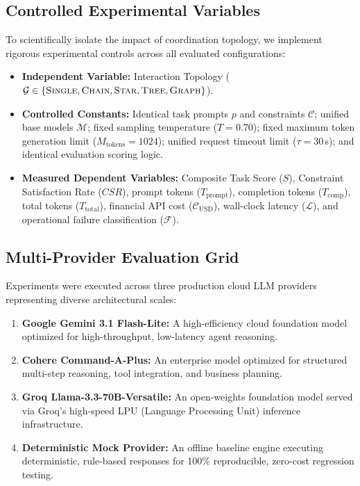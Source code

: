 \subsection{Controlled Experimental Variables}
To scientifically isolate the impact of coordination topology, we implement rigorous experimental controls across all evaluated configurations:
\begin{itemize}
    \item \textbf{Independent Variable:} Interaction Topology ($\mathcal{G} \in \{\textsc{Single}, \textsc{Chain}, \textsc{Star}, \textsc{Tree}, \textsc{Graph}\}$).
    \item \textbf{Controlled Constants:} Identical task prompts $p$ and constraints $\mathcal{C}$; unified base models $\mathcal{M}$; fixed sampling temperature ($T = 0.70$); fixed maximum token generation limit ($M_{\text{tokens}} = 1024$); unified request timeout limit ($\tau = 30\,$s); and identical evaluation scoring logic.
    \item \textbf{Measured Dependent Variables:} Composite Task Score ($S$), Constraint Satisfaction Rate ($CSR$), prompt tokens ($T_{\text{prompt}}$), completion tokens ($T_{\text{comp}}$), total tokens ($T_{\text{total}}$), financial API cost ($\mathcal{C}_{\text{USD}}$), wall-clock latency ($\mathcal{L}$), and operational failure classification ($\mathcal{F}$).
\end{itemize}

\subsection{Multi-Provider Evaluation Grid}
Experiments were executed across three production cloud LLM providers representing diverse architectural scales:
\begin{enumerate}
    \item \textbf{Google Gemini 3.1 Flash-Lite:} A high-efficiency cloud foundation model optimized for high-throughput, low-latency agent reasoning.
    \item \textbf{Cohere Command-A-Plus:} An enterprise model optimized for structured multi-step reasoning, tool integration, and business planning.
    \item \textbf{Groq Llama-3.3-70B-Versatile:} An open-weights foundation model served via Groq's high-speed LPU (Language Processing Unit) inference infrastructure.
    \item \textbf{Deterministic Mock Provider:} An offline baseline engine executing deterministic, rule-based responses for 100\% reproducible, zero-cost regression testing.
\end{enumerate}

